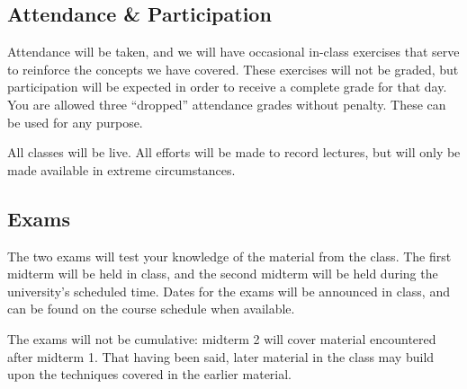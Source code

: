 \documentclass[12pt]{scrartcl}
\begin{document}
\subsection{Attendance \& Participation}
Attendance will be taken, 
and we will have occasional in-class exercises that serve to reinforce the concepts we have covered. 
These exercises will not be graded, but participation will be expected in order to receive a complete grade for that day.
You are allowed three ``dropped'' attendance grades without penalty. 
These can be used for any purpose. 

All classes will be live.
All efforts will be made to record lectures, but will only be made available in extreme circumstances.

\subsection{Exams}
The two exams will test your knowledge of the material from the class. 
The first midterm will be held in class, and the second midterm will be held during the university’s scheduled time. 
Dates for the exams will be announced in class, and can be found on the course schedule when available.

The exams will not be cumulative: midterm 2 will cover material encountered after midterm 1. 
That having been said, later material in the class may build upon the techniques covered in the earlier material.







\end{document}
